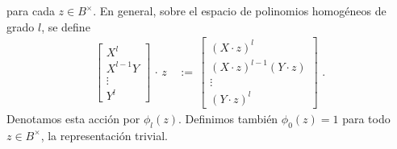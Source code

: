 %
para cada $z\in B^{\times}$. En general, sobre el espacio de polinomios
homog\'{e}neos de grado $l$, se define
\begin{align*}
	\begin{bmatrix} X^{l} \\ X^{l-1}Y \\ \vdots \\ Y^{l} \end{bmatrix}
		\,\cdot\,z & \,:=\,
		\begin{bmatrix}
			(X\cdot z)^{l} \\
			(X\cdot z)^{l-1}(Y\cdot z) \\
			\vdots \\ (Y\cdot z)^{l}
		\end{bmatrix}
	\text{ .}
\end{align*}
%
Denotamos esta acci\'{o}n por $\phi_{l}(z)$. Definimos tambi\'{e}n
$\phi_{0}(z)=1$ para todo $z\in B^{\times}$, la representaci\'{o}n trivial.

